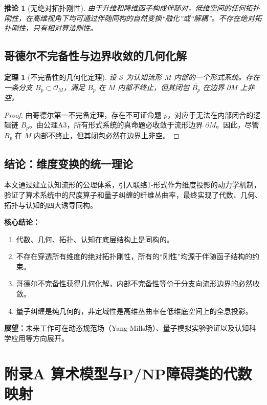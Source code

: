 \documentclass[11pt,a4paper]{article}
\newtheorem{theorem}{定理}
\newtheorem{corollary}{推论}
\begin{document}
\begin{corollary}[无绝对拓扑刚性]
由于升维和降维函子构成伴随对，低维空间的任何拓扑刚性，在高维视角下均可通过伴随同构的自然变换“融化”或“解耦”。不存在绝对拓扑刚性，只有相对算法刚性。
\end{corollary}

\subsection{哥德尔不完备性与边界收敛的几何化解}
\begin{theorem}[不完备性的几何化定理]
设 \(\mathcal S\) 为认知流形 \(M\) 内部的一个形式系统。存在一条分支 \(B_p\subset \mathcal O_M\)，满足 \(B_p\) 在 \(M\) 内部不终止，但其闭包 \(\overline{B_p}\) 在边界 \(\partial M\) 上非空。
\end{theorem}
\begin{proof}
由哥德尔第一不完备定理，存在不可证命题 \(p\)，对应于无法在内部闭合的逻辑链 \(B_p\)。由公理A3，所有形式系统的真命题必收敛于流形边界 \(\partial M\)。因此，尽管 \(B_p\) 在 \(M\) 内部不终止，但其闭包必然在边界上非空。
\end{proof}

\subsection{结论：维度变换的统一理论}
本文通过建立认知流形的公理体系，引入联络1-形式作为维度投影的动力学机制，验证了算术系统中的尺度算子和量子纠缠的纤维丛曲率，最终实现了代数、几何、拓扑与认知的四大诱导同构。

\textbf{核心结论：}
\begin{enumerate}
    \item 代数、几何、拓扑、认知在底层结构上是同构的。
    \item 不存在穿透所有维度的绝对拓扑刚性，所有的“刚性”均源于伴随函子结构的约束。
    \item 哥德尔不完备性获得几何化解，内部不完备性等价于分支向流形边界的必然收敛。
    \item 量子纠缠是纯几何的，非定域性是高维丛曲率在低维底空间上的全息投影。
\end{enumerate}

\textbf{展望：}未来工作可在动态规范场（Yang-Mills场）、量子模拟实验验证以及认知科学应用等方向展开。

\clearpage
\appendix
\section{附录A 算术模型与P/NP障碍类的代数映射}
\end{document}
